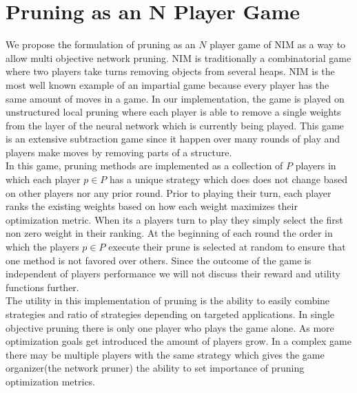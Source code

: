 \documentclass[11pt]{article}
\begin{document}
\section{Pruning as an N Player Game}
We propose the formulation of pruning as an $N$ player game of NIM as a way to allow multi objective network pruning. NIM is traditionally a combinatorial game where two players take turns removing objects from several heaps. NIM is the most well known example of an impartial game because every player has the same amount of moves in a game. In our implementation, the game is played on unstructured local pruning where each player is able to remove a single weights from the layer of the neural network which is currently being played. This game is an extensive subtraction game since it happen over many rounds of play and players make moves by removing parts of a structure. \\
In this game, pruning methods are implemented as a collection of $P$ players in which each player $p \in P$ has a unique strategy which does does not change based on other players nor any prior round. Prior to playing their turn, each player ranks the existing weights based on how each weight maximizes their optimization metric. When its a players turn to play they simply select the first non zero weight in their ranking. At the beginning of each round the order in which the players $p \in P$ execute their prune is selected at random to ensure that one method is not favored over others.  Since the outcome of the game is independent of players performance we will not discuss their reward and utility functions further. \\
The utility in this implementation of pruning is the ability to easily combine strategies and ratio of strategies depending on targeted applications. In single objective pruning there is only one player who plays the game alone. As more optimization goals get introduced the amount of players grow. In a complex game there may be multiple players with the same strategy which gives the game organizer(the network pruner) the ability to set importance of pruning optimization metrics. 
\end{document}
